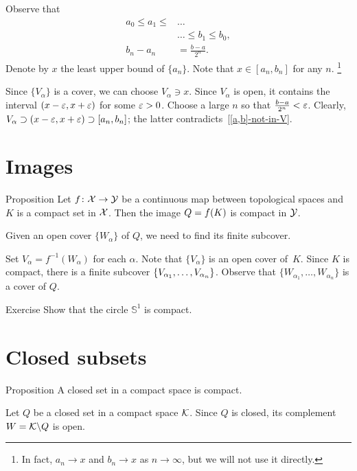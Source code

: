 Observe that 
\begin{align*}
a_0\le a_1\le &\dots 
\\
&\dots \le b_1\le b_0,
\\
b_n-a_n&=\tfrac{b-a}{2^n}.
\end{align*}
Denote by $x$ the least upper bound of $\{a_n\}$.
Note that $x\in [a_n,b_n]$ for any $n$.%
\footnote{In fact, $a_n\to x$ and $b_n\to x$ as $n\to\infty$, but we will not use it directly.}

Since $\{V_\alpha\}$ is a cover, we can choose $V_\alpha\ni x$.
Since $V_\alpha$ is open, it contains the interval $(x-\varepsilon,x+\varepsilon)$ for some $\varepsilon>0$.
Choose a large $n$ so that $\tfrac{b-a}{2^n}<\varepsilon$.
Clearly, $V_\alpha\supset (x-\varepsilon,x+\varepsilon)\supset[a_n,b_n]$;
the latter contradicts~\ref{[a,b]-not-in-V}.\qeds



\section{Images}

\begin{thm}{Proposition}
Let $f\colon\mathcal{X}\to\mathcal{Y}$ be a continuous map between topological spaces and $K$ is a compact set in $\mathcal{X}$.
Then the image $Q\z=f(K)$ is compact in $\mathcal{Y}$.
\end{thm}

Given an open cover $\{W_\alpha\}$ of $Q$, we need to find its finite subcover.

Set $V_\alpha=f^{-1}(W_\alpha)$ for each $\alpha$.
Note that $\{V_\alpha\}$ is an open cover of~$K$.
Since $K$ is compact, there is a finite subcover $\{V_{\alpha_1},\z\dots, V_{\alpha_n}\}$.
Observe that $\{W_{\alpha_1},\dots, W_{\alpha_n}\}$ is a cover of $Q$.
\qeds

\begin{thm}{Exercise}
Show that the circle $\mathbb{S}^1$ is compact.
\end{thm}

\section{Closed subsets}

\begin{thm}{Proposition}\label{prop:compact-closed}
A closed set in a compact space is compact.
\end{thm}

Let $Q$ be a closed set in a compact space $\mathcal{K}$.
Since $Q$ is closed, its complement $W=\mathcal{K}\backslash Q$ is open.

